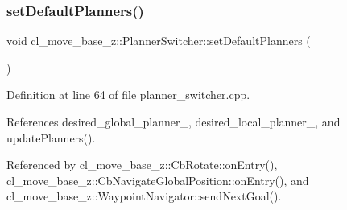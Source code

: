 \subsubsection{\texorpdfstring{set\+Default\+Planners()}{setDefaultPlanners()}}
{\footnotesize\ttfamily void cl\+\_\+move\+\_\+base\+\_\+z\+::\+Planner\+Switcher\+::set\+Default\+Planners (\begin{DoxyParamCaption}{ }\end{DoxyParamCaption})}



Definition at line 64 of file planner\+\_\+switcher.\+cpp.



References desired\+\_\+global\+\_\+planner\+\_\+, desired\+\_\+local\+\_\+planner\+\_\+, and update\+Planners().



Referenced by cl\+\_\+move\+\_\+base\+\_\+z\+::\+Cb\+Rotate\+::on\+Entry(), cl\+\_\+move\+\_\+base\+\_\+z\+::\+Cb\+Navigate\+Global\+Position\+::on\+Entry(), and cl\+\_\+move\+\_\+base\+\_\+z\+::\+Waypoint\+Navigator\+::send\+Next\+Goal().


